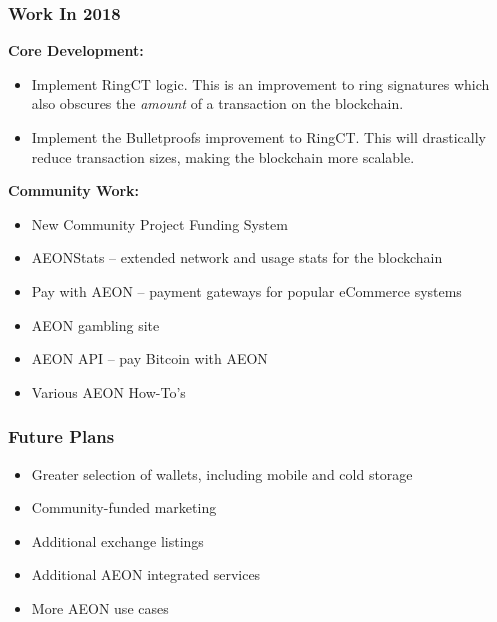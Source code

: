 \subsubsection{Work In 2018}
\textbf{Core Development:}
\begin{itemize}
	\item Implement RingCT logic. This is an improvement to ring signatures which also obscures the \textit{amount} of a transaction on the blockchain.
	\item Implement the Bulletproofs improvement to RingCT. This will drastically reduce transaction sizes, making the blockchain more scalable.
\end{itemize}
\textbf{Community Work:}
\begin{itemize}
	\item New Community Project Funding System
	\item AEONStats -- extended network and usage stats for the blockchain
	\item Pay with AEON -- payment gateways for popular eCommerce systems
	\item AEON gambling site
	\item AEON API -- pay Bitcoin with AEON
	\item Various AEON How-To's
\end{itemize}

\subsubsection{Future Plans}
\begin{itemize}
	\item Greater selection of wallets, including mobile and cold storage
	\item Community-funded marketing
	\item Additional exchange listings
	\item Additional AEON integrated services
	\item More AEON use cases
\end{itemize}

